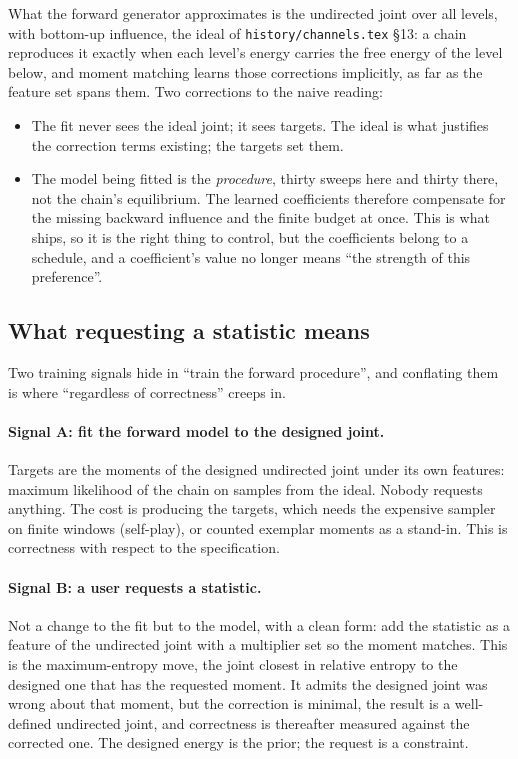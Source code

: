 \documentclass[11pt]{article}
\newcommand{\1}{\mathds{1}}
\newcommand{\code}[1]{\texttt{#1}}
\begin{document}
What the forward generator approximates is the undirected joint over all
levels, with bottom-up influence, the ideal of \code{history/channels.tex} \S13:
a chain reproduces it exactly when each level's energy carries the free
energy of the level below, and moment matching learns those corrections
implicitly, as far as the feature set spans them. Two corrections to the
naive reading:
\begin{itemize}
\item The fit never sees the ideal joint; it sees targets. The ideal is
  what justifies the correction terms existing; the targets set them.
\item The model being fitted is the \emph{procedure}, thirty sweeps here
  and thirty there, not the chain's equilibrium. The learned coefficients
  therefore compensate for the missing backward influence and the finite
  budget at once. This is what ships, so it is the right thing to
  control, but the coefficients belong to a schedule, and a coefficient's
  value no longer means ``the strength of this preference''.
\end{itemize}

\subsection{What requesting a statistic means}

Two training signals hide in ``train the forward procedure'', and
conflating them is where ``regardless of correctness'' creeps in.

\paragraph{Signal A: fit the forward model to the designed joint.} Targets
are the moments of the designed undirected joint under its own features:
maximum likelihood of the chain on samples from the ideal. Nobody
requests anything. The cost is producing the targets, which needs the
expensive sampler on finite windows (self-play), or counted exemplar
moments as a stand-in. This is correctness with respect to the
specification.

\paragraph{Signal B: a user requests a statistic.} Not a change to the
fit but to the model, with a clean form: add the statistic as a feature
of the undirected joint with a multiplier set so the moment matches. This
is the maximum-entropy move, the joint closest in relative entropy to the
designed one that has the requested moment. It admits the designed joint
was wrong about that moment, but the correction is minimal, the result is
a well-defined undirected joint, and correctness is thereafter measured
against the corrected one. The designed energy is the prior; the request
is a constraint.
\end{document}
